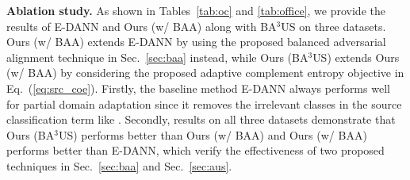 \documentclass[runningheads]{llncs}
\begin{document}
	\setlength{\tabcolsep}{3.0pt}
	\begin{table*}[htbp]
		\centering
		\scriptsize
		\caption{Accuracy (\%) on \textbf{Office31} for \emph{partial domain adaptation} via VGG-16~\cite{simonyan2014very}. The best in \textbf{\color{red}{bold red}}; the second best in \textit{\color{blue}{italic blue}}.}
		\label{tab:vgg}
	\end{table*}

\textbf{Ablation study.}
As shown in Tables~\ref{tab:oc} and \ref{tab:office}, we provide the results of E-DANN and Ours (w/ BAA) along with BA$^3$US on three datasets.
Ours (w/ BAA) extends E-DANN by using the proposed balanced adversarial alignment technique in Sec.~\ref{sec:baa} instead, while Ours (BA$^3$US) extends Ours (w/ BAA) by considering the proposed adaptive complement entropy objective in Eq.~(\ref{eq:src_coe}).
Firstly, the baseline method E-DANN always performs well for partial domain adaptation since it removes the irrelevant classes in the source classification term like \cite{cao2018partial}.
Secondly, results on all three datasets demonstrate that Ours (BA$^3$US) performs better than Ours (w/ BAA) and Ours (w/ BAA) performs better than E-DANN, which verify the effectiveness of two proposed techniques in Sec.~\ref{sec:baa} and Sec.~\ref{sec:aus}.
	
\end{document}
